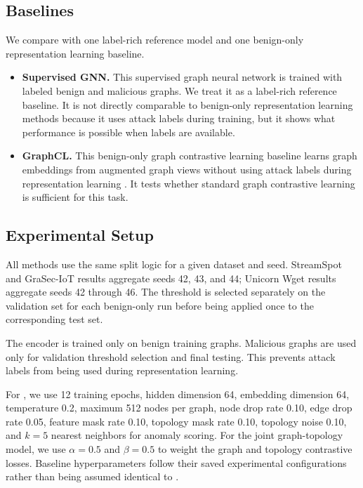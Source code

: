 \subsection{Baselines}

We compare \sysname{} with one label-rich reference model and one benign-only representation learning baseline.

\begin{itemize}
    \item \textbf{Supervised GNN.} This supervised graph neural network is trained with labeled benign and malicious graphs. We treat it as a label-rich reference baseline. It is not directly comparable to benign-only representation learning methods because it uses attack labels during training, but it shows what performance is possible when labels are available.

    \item \textbf{GraphCL.} This benign-only graph contrastive learning baseline learns graph embeddings from augmented graph views without using attack labels during representation learning \cite{you2020graphcl}. It tests whether standard graph contrastive learning is sufficient for this task.
\end{itemize}

\subsection{Experimental Setup}

All methods use the same split logic for a given dataset and seed. StreamSpot and GraSec-IoT results aggregate seeds 42, 43, and 44; Unicorn Wget results aggregate seeds 42 through 46. The threshold is selected separately on the validation set for each benign-only run before being applied once to the corresponding test set.

The encoder is trained only on benign training graphs. Malicious graphs are used only for validation threshold selection and final testing. This prevents attack labels from being used during representation learning.

For \sysname{}, we use 12 training epochs, hidden dimension 64, embedding dimension 64, temperature 0.2, maximum 512 nodes per graph, node drop rate 0.10, edge drop rate 0.05, feature mask rate 0.10, topology mask rate 0.10, topology noise 0.10, and $k=5$ nearest neighbors for anomaly scoring. For the joint graph-topology model, we use $\alpha=0.5$ and $\beta=0.5$ to weight the graph and topology contrastive losses. Baseline hyperparameters follow their saved experimental configurations rather than being assumed identical to \sysname{}.

